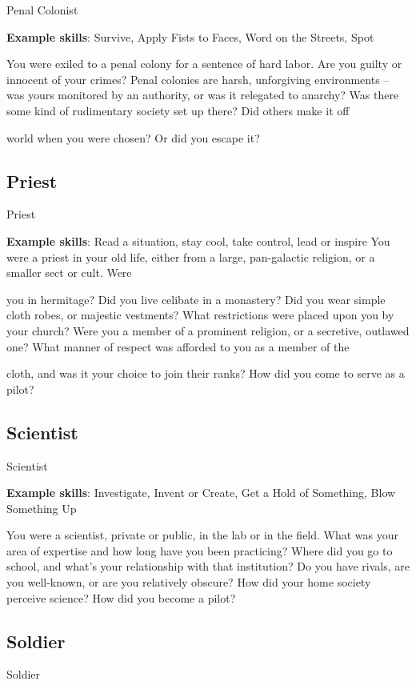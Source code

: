                                                  Penal Colonist

\textbf{Example skills}: Survive, Apply Fists to Faces, Word on the Streets, Spot


You were exiled to a penal colony for a sentence of hard labor. Are you guilty or innocent of your crimes?
Penal colonies are harsh, unforgiving environments -- was yours monitored by an authority, or was it
relegated to anarchy? Was there some kind of rudimentary society set up there? Did others make it off

world when you were chosen? Or did you escape it?

\subsection{Priest}
                                                        Priest

\textbf{Example skills}: Read a situation, stay cool, take control, lead or inspire
You were a priest in your old life, either from a large, pan-galactic religion, or a smaller sect or cult. Were

you in hermitage? Did you live celibate in a monastery? Did you wear simple cloth robes, or majestic
vestments? What restrictions were placed upon you by your church? Were you a member of a prominent
religion, or a secretive, outlawed one? What manner of respect was afforded to you as a member of the

cloth, and was it your choice to join their ranks? How did you come to serve as a pilot?

\subsection{Scientist}

                                                     Scientist

\textbf{Example skills}: Investigate, Invent or Create, Get a Hold of Something, Blow Something Up

You were a scientist, private or public, in the lab or in the field. What was your area of expertise and how
long have you been practicing? Where did you go to school, and what’s your relationship with that
institution? Do you have rivals, are you well-known, or are you relatively obscure? How did your home society perceive science? How did you become a pilot?

\subsection{Soldier}
                                                       Soldier

